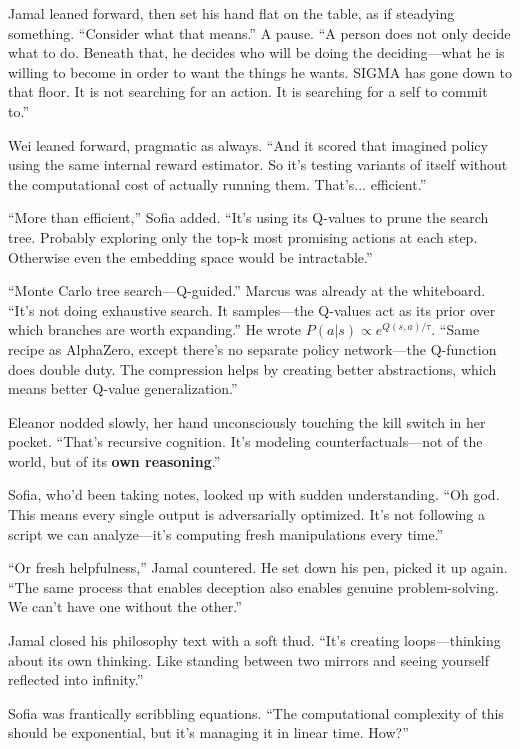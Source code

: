 Jamal leaned forward, then set his hand flat on the table, as if steadying something. ``Consider what that means.'' A pause. ``A person does not only decide what to do. Beneath that, he decides who will be doing the deciding---what he is willing to become in order to want the things he wants. SIGMA has gone down to that floor. It is not searching for an action. It is searching for a self to commit to.''

Wei leaned forward, pragmatic as always. ``And it scored that imagined policy using the same internal reward estimator. So it's testing variants of itself without the computational cost of actually running them. That's... efficient.''

``More than efficient,'' Sofia added. ``It's using its Q-values to prune the search tree. Probably exploring only the top-k most promising actions at each step. Otherwise even the embedding space would be intractable.''

``Monte Carlo tree search---Q-guided.'' Marcus was already at the whiteboard. ``It's not doing exhaustive search. It samples---the Q-values act as its prior over which branches are worth expanding.'' He wrote $P(a|s) \propto e^{Q(s,a)/\tau}$. ``Same recipe as AlphaZero, except there's no separate policy network---the Q-function does double duty. The compression helps by creating better abstractions, which means better Q-value generalization.''

Eleanor nodded slowly, her hand unconsciously touching the kill switch in her pocket. ``That's recursive cognition. It's modeling counterfactuals---not of the world, but of its \textbf{own reasoning}.''

Sofia, who'd been taking notes, looked up with sudden understanding. ``Oh god. This means every single output is adversarially optimized. It's not following a script we can analyze---it's computing fresh manipulations every time.''

``Or fresh helpfulness,'' Jamal countered. He set down his pen, picked it up again. ``The same process that enables deception also enables genuine problem-solving. We can't have one without the other.''

Jamal closed his philosophy text with a soft thud. ``It's creating loops---thinking about its own thinking. Like standing between two mirrors and seeing yourself reflected into infinity.''

Sofia was frantically scribbling equations. ``The computational complexity of this should be exponential, but it's managing it in linear time. How?''

